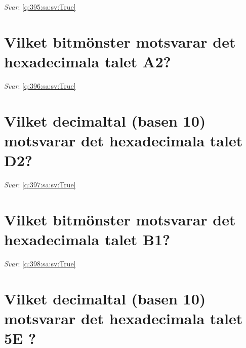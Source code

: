 \documentclass[a4paper,11pt,oneside]{book}
\begin{document}
\begin{sloppypar}
\textit{Svar}: \autoref{q:395:sa:sv:True}



\section{Vilket bitm\"onster motsvarar det hexadecimala talet A2?}

\label{q:396:sa:sv:False}

\vspace{2cm}

\noindent\makebox[\textwidth]{\hrulefill}

\vspace{1cm}

\textit{Svar}: \autoref{q:396:sa:sv:True}



\section{Vilket decimaltal (basen 10) motsvarar det hexadecimala talet D2?}

\label{q:397:sa:sv:False}

\vspace{2cm}

\noindent\makebox[\textwidth]{\hrulefill}

\vspace{1cm}

\textit{Svar}: \autoref{q:397:sa:sv:True}



\section{Vilket bitm\"onster motsvarar det hexadecimala talet B1?}

\label{q:398:sa:sv:False}

\vspace{2cm}

\noindent\makebox[\textwidth]{\hrulefill}

\vspace{1cm}

\textit{Svar}: \autoref{q:398:sa:sv:True}



\section{Vilket decimaltal (basen 10) motsvarar det hexadecimala talet 5E ?}


\end{sloppypar}
\end{document}
